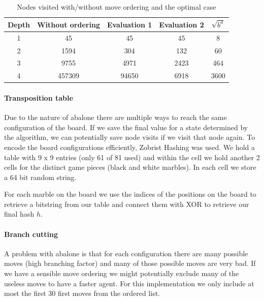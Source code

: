 \documentclass{llncs}
\begin{document}
\begin{table}
	\begin{center}
		\begin{tabular}{ | c | c | c | c | c | }
			\hline
			Depth & Without ordering & Evaluation 1 & Evaluation 2 & $\sqrt{b^d}$ \\
			\hline
			1     & 45               & 45           & 45           & 8            \\
			\hline
			2     & 1594             & 304          & 132          & 60           \\
			\hline
			3     & 9755             & 4971         & 2423         & 464          \\
			\hline
			4     & 457309           & 94650        & 6918         & 3600         \\
			\hline
		\end{tabular}
	\end{center}
	\caption{Nodes visited with/without move ordering and the optimal case}
	\label{node_count}
\end{table}

\paragraph{Transposition table}
Due to the nature of abalone there are multiple ways to reach the same configuration of the board. If we save the final value for a state determined by the algorithm, we can potentially save node visits if we visit that node again. To encode the board configurations efficiently, Zobrist Hashing \cite{noauthor_zobrist_nodate} was used. We hold a table with 9 x 9 entries (only 61 of 81 used) and within the cell we hold another 2 cells for the distinct game pieces (black and white marbles). In each cell we store a 64 bit random string.

For each marble on the board we use the indices of the positions on the board to retrieve a bitstring from our table and connect them with XOR to retrieve our final hash $h$.

\paragraph{Branch cutting}
A problem with abalone is that for each configuration there are many possible moves (high branching factor) and many of those possible moves are very bad. If we have a sensible move ordering we might potentially exclude many of the useless moves to have a faster agent. For this implementation we only include at most the first 30 first moves from the ordered list.
\end{document}
